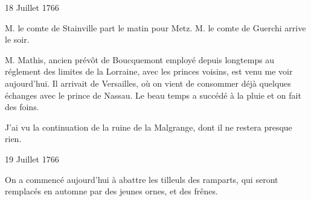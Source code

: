                      \begin{diary}{18 Juillet 1766}{}
                        
                        
                           M. le comte de Stainville part le
                           matin
                           pour Metz. M. le comte de Guerchi
                           arrive le soir. \bigskip
        
        
                        
                           M. Mathis, ancien prévôt de
                              Boucquemont
                           employé depuis longtemps au réglement des
                           limites de la Lorraine, avec
                           les princes
                           voisins, est venu me voir aujourd'hui. Il
                           arrivait de Versailles,
                           où on vient de consommer
                           déjà quelques échanges avec le prince
                              de
                              Nassau. Le beau temps a succédé à la pluie
                           et on fait des foins. \bigskip
        
        
                         J'ai vu la continuation de la ruine
                           de
                           la Malgrange, dont il ne restera
                           presque rien. \bigskip
        
        
                     \end{diary}

                     \begin{diary}{19 Juillet 1766}{}
                        
                         On a commencé aujourd'hui à abattre les
                           tilleuls des ramparts, qui seront remplacés
                           en automne par des jeunes ornes, et des frênes. \bigskip
        
        
                     \end{diary}

